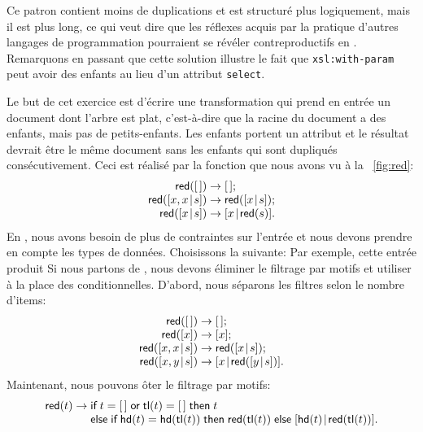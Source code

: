Ce patron contient moins de duplications et est structuré plus
logiquement, mais il est plus long, ce qui veut dire que les réflexes
acquis par la pratique d'autres langages de programmation pourraient
se révéler contreproductifs en \XSLT. Remarquons en passant que cette
solution illustre le fait que \texttt{xsl:with-param} peut avoir des
enfants au lieu d'un attribut \texttt{select}.


Le but de cet exercice est d'écrire une transformation \XSLT qui prend
en entrée un document dont l'arbre est plat, c'est-à-dire que la
racine du document a des enfants, mais pas de petits-enfants. Les
enfants portent un attribut et le résultat devrait être le même
document sans les enfants qui sont dupliqués consécutivement. Ceci est
réalisé par la fonction  que nous avons vu à la
\fig~\vref{fig:red}:
\begin{equation*}
\begin{array}{@{}r@{\;}c@{\;}l@{}}
\fun{red}(\el) & \rightarrow & \el;\\
\fun{red}(\cons{x,x}{s}) & \rightarrow & \fun{red}(\cons{x}{s});\\
\fun{red}(\cons{x}{s})   & \rightarrow & \cons{x}{\fun{red}(s)}.
\end{array}
\end{equation*}
En \XSLT, nous avons besoin de plus de contraintes sur l'entrée et
nous devons prendre en compte les types de données. Choisissons la \DTD suivante:
\noindent Par exemple, cette entrée
\noindent produit
\noindent Si nous partons de , nous devons éliminer le
filtrage par motifs et utiliser à la place des
conditionnelles. D'abord, nous séparons les filtres selon le nombre
d'items:
\begin{equation*}
\begin{array}{@{}r@{\;}c@{\;}l@{}}
\fun{red}(\el) & \rightarrow & \el;\\
\fun{red}([x]) & \rightarrow & [x];\\
\fun{red}(\cons{x,x}{s}) & \rightarrow & \fun{red}(\cons{x}{s});\\
\fun{red}(\cons{x,y}{s}) & \rightarrow & \cons{x}{\fun{red}(\cons{y}{s})}.
\end{array}
\end{equation*}
Maintenant, nous pouvons ôter le filtrage par motifs:
\begin{equation*}
\begin{array}{@{}r@{\;}c@{\;}l@{}}
\fun{red}(t) & \rightarrow & \fun{if} \; t=\el\; \fun{or} \;
                             \fun{tl}(t)=\el \; \fun{then} \; t\\
             &             & \fun{else} \; \fun{if} \; \fun{hd}(t) = \fun{hd}(\fun{tl}(t)) \;
\fun{then} \; \fun{red}(\fun{tl}(t)) \; \fun{else} \; \cons{\fun{hd}(t)}{\fun{red}(\fun{tl}(t))}.
\end{array}
\end{equation*}
